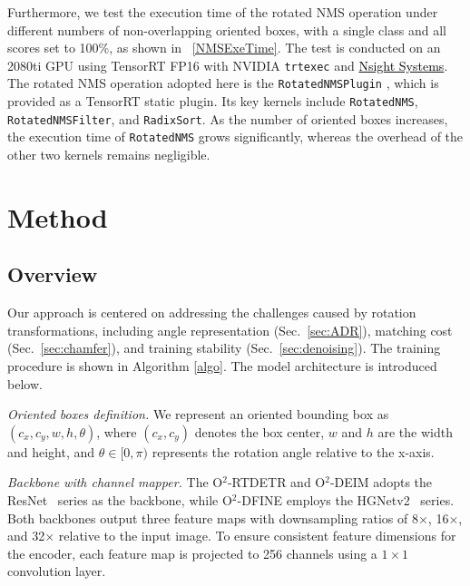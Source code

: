 \documentclass[lettersize,journal]{IEEEtran}
\begin{document}
Furthermore, we test the execution time of the rotated NMS operation under different numbers of non-overlapping oriented boxes, with a single class and all scores set to 100\%, as shown in \figurename~\ref{NMSExeTime}. The test is conducted on an \textcolor[HTML]{76B900}{} 2080ti GPU using TensorRT FP16 with NVIDIA \texttt{trtexec} and \href{https://developer.nvidia.com/nsight-systems}{\textcolor{black}{Nsight Systems}}. The rotated NMS operation adopted here is the \texttt{RotatedNMSPlugin} \href{https://github.com/laugh12321/TensorRT-YOLO}{\textcolor[HTML]{181717}{}}, which is provided as a TensorRT static plugin. Its key kernels include \texttt{RotatedNMS}, \texttt{RotatedNMSFilter}, and \texttt{RadixSort}.  As the number of oriented boxes increases, the execution time of \texttt{RotatedNMS} grows significantly, whereas the overhead of the other two kernels remains negligible.



\section{Method}

\angleDistribution

\subsection{Overview}


Our approach is centered on addressing the challenges caused by rotation transformations, including angle representation (Sec.~\ref{sec:ADR}), matching cost (Sec.~\ref{sec:chamfer}), and training stability (Sec.~\ref{sec:denoising}). The training procedure is shown in Algorithm \ref{algo}. The model architecture is introduced below.

\textit{Oriented boxes definition.} We represent an oriented bounding box as $(c_x, c_y, w, h, \theta)$, where $(c_x, c_y)$ denotes the box center, $w$ and $h$ are the width and height, and $\theta \in [0, \pi)$ represents the rotation angle relative to the x-axis.

\textit{Backbone with channel mapper.} The O$^2$-RTDETR and O$^2$-DEIM adopts the ResNet~\cite{resnetd} series as the backbone, while O$^2$-DFINE employs the HGNetv2~\cite{paddlepaddle} series. Both backbones output three feature maps with downsampling ratios of 8$\times$, 16$\times$, and 32$\times$ relative to the input image. To ensure consistent feature dimensions for the encoder, each feature map is projected to 256 channels using a $1\times1$ convolution layer.
\end{document}
